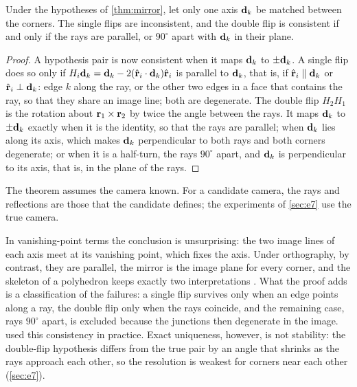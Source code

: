 \begin{remark}\label{cor:oneaxis}
Under the hypotheses of \cref{thm:mirror}, let only one axis $\mathbf{d}_k$ be matched between the corners. The single flips are inconsistent, and the double flip is consistent if and only if the rays are parallel, or $90^\circ$ apart with $\mathbf{d}_k$ in their plane.
\end{remark}
\begin{proof}
A hypothesis pair is now consistent when it maps $\mathbf{d}_k$ to $\pm\mathbf{d}_k$. A single flip does so only if $H_i\mathbf{d}_k=\mathbf{d}_k-2(\hat{\mathbf{r}}_i\cdot\mathbf{d}_k)\hat{\mathbf{r}}_i$ is parallel to $\mathbf{d}_k$, that is, if $\hat{\mathbf{r}}_i\parallel\mathbf{d}_k$ or $\hat{\mathbf{r}}_i\perp\mathbf{d}_k$: edge $k$ along the ray, or the other two edges in a face that contains the ray, so that they share an image line; both are degenerate. The double flip $H_2H_1$ is the rotation about $\mathbf{r}_1\times\mathbf{r}_2$ by twice the angle between the rays. It maps $\mathbf{d}_k$ to $\pm\mathbf{d}_k$ exactly when it is the identity, so that the rays are parallel; when $\mathbf{d}_k$ lies along its axis, which makes $\mathbf{d}_k$ perpendicular to both rays and both corners degenerate; or when it is a half-turn, the rays $90^\circ$ apart, and $\mathbf{d}_k$ is perpendicular to its axis, that is, in the plane of the rays.
\end{proof}

 The theorem assumes the camera known. For a candidate camera, the rays and reflections are those that the candidate defines; the experiments of \cref{sec:e7} use the true camera.

In vanishing-point terms the conclusion is unsurprising: the two image lines of each axis meet at its vanishing point, which fixes the axis. Under orthography, by contrast, they are parallel, the mirror is the image plane for every corner, and the skeleton of a polyhedron keeps exactly two interpretations \citep[Proposition~4]{kanatani1986}. What the proof adds is a classification of the failures: a single flip survives only when an edge points along a ray, the double flip only when the rays coincide, and the remaining case, rays $90^\circ$ apart, is excluded because the junctions then degenerate in the image. \citet{shakunaga1989} used this consistency in practice. Exact uniqueness, however, is not stability: the double-flip hypothesis differs from the true pair by an angle that shrinks as the rays approach each other, so the resolution is weakest for corners near each other (\cref{sec:e7}).



